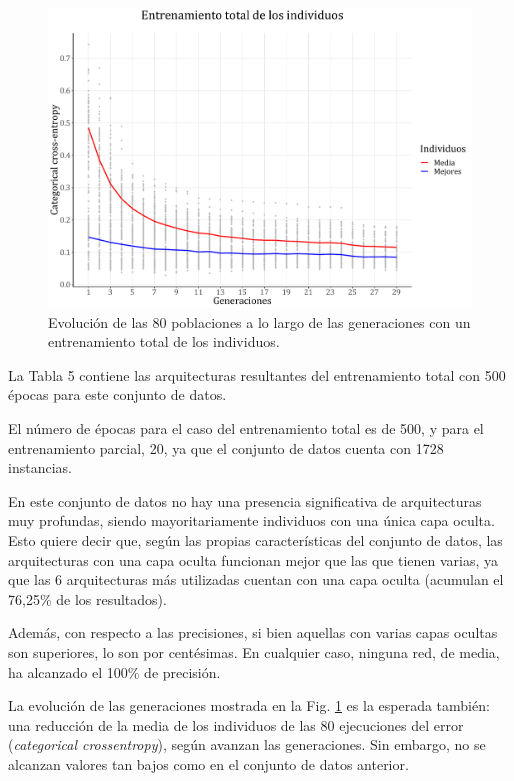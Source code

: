 \documentclass[spanish,a4paper,12pt,twoside]{report}
\begin{document}
  \begin{figure}[H]
    \centering
    \includegraphics[width = 1\textwidth]{resources/Fig21.pdf}
    \caption{Evolución de las 80 poblaciones a lo largo de las generaciones con un entrenamiento total de los individuos.}
    \label{fig:21}
  \end{figure} \par
  La Tabla 5 contiene las arquitecturas resultantes del entrenamiento total con 500 épocas para este conjunto de datos. \par
  El número de épocas para el caso del entrenamiento total es de 500, y para el entrenamiento parcial, 20, ya que el conjunto de datos cuenta con 1728 instancias. \par
  En este conjunto de datos no hay una presencia significativa de arquitecturas muy profundas, siendo mayoritariamente individuos con una única capa oculta. Esto quiere decir que, según las propias características del conjunto de datos, las arquitecturas con una capa oculta funcionan mejor que las que tienen varias, ya que las 6 arquitecturas más utilizadas cuentan con una capa oculta (acumulan el 76,25\% de los resultados). \par
  Además, con respecto a las precisiones, si bien aquellas con varias capas ocultas son superiores, lo son por centésimas. En cualquier caso, ninguna red, de media, ha alcanzado el 100\% de precisión. \par
  La evolución de las generaciones mostrada en la Fig. \ref{fig:21} es la esperada también: una reducción de la media de los individuos de las 80 ejecuciones del error (\emph{categorical crossentropy}), según avanzan las generaciones. Sin embargo, no se alcanzan valores tan bajos como en el conjunto de datos anterior. \par
\end{document}
